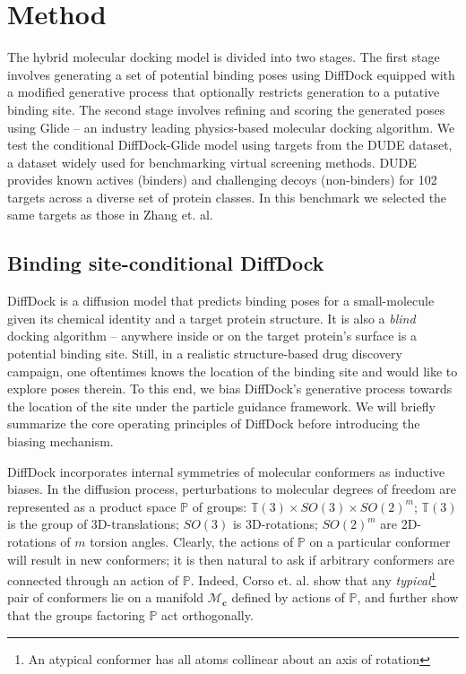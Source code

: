 \documentclass[%
 aip,
 amsmath,amssymb,
 reprint,%
]{revtex4-1}
\begin{document}
\section{Method}


The hybrid molecular docking model is divided into two stages. The first stage involves generating a set of potential binding poses using DiffDock equipped with a modified generative process that optionally restricts generation to a putative binding site. The second stage involves refining and scoring the generated poses using Glide -- an industry leading physics-based molecular docking algorithm. We test the conditional DiffDock-Glide model using targets from the DUDE dataset, a dataset widely used for benchmarking virtual screening methods. DUDE provides known actives (binders) and challenging decoys (non-binders) for 102 targets across a diverse set of protein classes. In this benchmark we selected the same targets as those in Zhang et. al.\citep{zhang2023benchmarking}

\subsection{Binding site-conditional DiffDock}

DiffDock is a diffusion model that predicts binding poses for a small-molecule given its chemical identity and a target protein structure. It is also a {\it blind} docking algorithm -- anywhere inside or on the target protein's surface is a potential binding site. Still, in a realistic structure-based drug discovery campaign, one oftentimes knows the location of the binding site and would like to explore poses therein. To this end, we bias DiffDock's generative process towards the location of the site under the particle guidance framework\cite{corso2023particle}. We will briefly summarize the core operating principles of DiffDock before introducing the biasing mechanism.




DiffDock incorporates internal symmetries of molecular conformers as
inductive biases. In the diffusion process, perturbations to molecular degrees of freedom are represented as a product space $\mathbb{P}$ of groups: $\mathbb{T}(3) \times SO(3) \times SO(2)^m$; $\mathbb{T}(3)$ is the group of 3D-translations; $SO(3)$ is 3D-rotations; $SO(2)^m$ are 2D-rotations of $m$ torsion angles. Clearly, the actions of $\mathbb{P}$ on a particular conformer will result in new conformers; it is then natural to ask if arbitrary conformers are connected through an action of $\mathbb{P}$. Indeed, Corso et. al.\cite{corso2022diffdock} show that any {\it typical}\footnote{An atypical conformer has all atoms collinear about an axis of rotation\cite{corso2022diffdock}} pair of conformers lie on a manifold $\mathcal{M}_\mathbf{c}$ defined by actions of $\mathbb{P}$, and further show that the groups factoring $\mathbb{P}$ act orthogonally.
\end{document}
